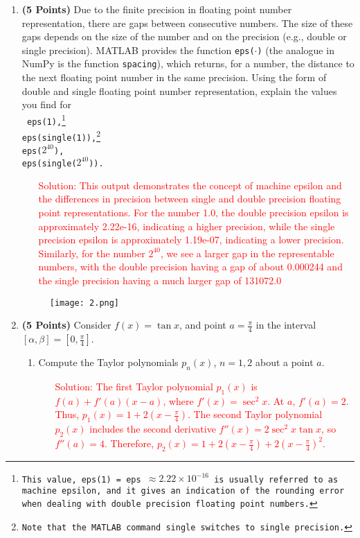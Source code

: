 \documentclass[11pt]{article}
\begin{document}
\begin{enumerate}
\item {\bf (5 Points)} Due to the finite precision in floating point
  number representation, there are gaps between consecutive
  numbers. The size of these gaps depends on the size of the number
  and on the precision (e.g., double or single precision). MATLAB
  provides the function \texttt{eps($\cdot$)} (the analogue in NumPy
  is the function \texttt{spacing}), which returns, for a number, the
  distance to the next floating point number in the same precision.
  Using the form of double and single floating point number
  representation, explain the values you find for\\[1ex] \texttt{
    eps(1),\footnote{This value, \texttt{eps(1)} = \texttt{eps}
      $\approx 2.22\times 10^{-16}$ is usually referred to as machine
      epsilon, and it gives an indication of the rounding error when
      dealing with double precision floating point
      numbers.}\\ eps(single(1)),\footnote{Note that the MATLAB
      command \texttt{single} switches to single
      precision.}\\ eps($2^{40}$),\\ eps(single($2^{40}$)).}

    \begin{enumerate}
        \item[\textcolor{red}{Solution:}] \textcolor{red}{This output demonstrates the concept of machine epsilon and the differences in precision between single and double precision floating point representations. For the number 1.0, the double precision epsilon is approximately 2.22e-16, indicating a higher precision, while the single precision epsilon is approximately 1.19e-07, indicating a lower precision. Similarly, for the number $2^{40}$, we see a larger gap in the representable numbers, with the double precision having a gap of about 0.000244 and the single precision having a much larger gap of 131072.0}
    \end{enumerate}

    \begin{figure}[h]
    \centering
    \texttt{[image: 2.png]} 
    \end{figure}


  \item {\bf (5 Points)} Consider $f(x) = \tan x$, and point $a =
  \frac{\pi}{4}$ in the interval $[\alpha, \beta] = [0,
    \frac{\pi}{4}]$.
    
  \begin{enumerate}
  \item Compute the Taylor polynomials $p_n(x)$, $n = 1, 2$ about
    a point $a$.
    \begin{enumerate}
        \item[\textcolor{red}{Solution:}] \textcolor{red}{The first Taylor polynomial $p_1(x)$ is $f(a) + f'(a)(x-a)$, where $f'(x) = \sec^2 x$. At $a$, $f'(a) = 2$. Thus, $p_1(x) = 1 + 2(x - \frac{\pi}{4})$. The second Taylor polynomial $p_2(x)$ includes the second derivative $f''(x) = 2\sec^2 x \tan x$, so $f''(a) = 4$. Therefore, $p_2(x) = 1 + 2(x - \frac{\pi}{4}) + 2(x - \frac{\pi}{4})^2$.}
    \end{enumerate}


\end{enumerate}
\end{enumerate}
\end{document}
